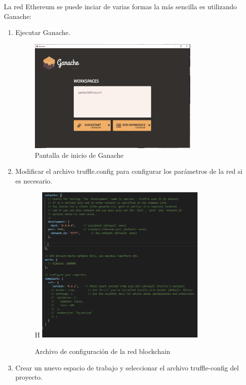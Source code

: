 \documentclass[12pt]{report}
\begin{document}
La red Ethereum se puede inciar de varias formas la más sencilla es utilizando Ganache:
\begin{enumerate}
\item Ejecutar Ganache.

\begin{figure}[H]
\includegraphics[width=0.8\textwidth]{ganache-ini}
\caption{Pantalla de inicio de Ganache}
\end{figure}


\item Modificar el archivo truffle.config para configurar los parámetros de la red si es necesario.

\begin{figure}{H}
\includegraphics[width=0.8\textwidth]{truffle-configjs}
\caption{Archivo de configuración de la red blockchain}
\end{figure}

\item Crear un nuevo espacio de trabajo y seleccionar el archivo truffle-config del proyecto.


\end{enumerate}
\end{document}
